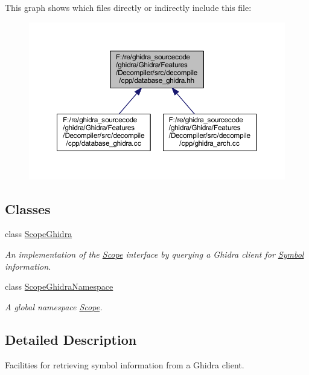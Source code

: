 This graph shows which files directly or indirectly include this file\+:
\nopagebreak
\begin{figure}[H]
\begin{center}
\leavevmode
\includegraphics[width=350pt]{database__ghidra_8hh__dep__incl}
\end{center}
\end{figure}
\subsection*{Classes}
\begin{DoxyCompactItemize}
\item 
class \mbox{\hyperlink{class_scope_ghidra}{Scope\+Ghidra}}
\begin{DoxyCompactList}\small\item\em An implementation of the \mbox{\hyperlink{class_scope}{Scope}} interface by querying a Ghidra client for \mbox{\hyperlink{class_symbol}{Symbol}} information. \end{DoxyCompactList}\item 
class \mbox{\hyperlink{class_scope_ghidra_namespace}{Scope\+Ghidra\+Namespace}}
\begin{DoxyCompactList}\small\item\em A global {\itshape namespace} \mbox{\hyperlink{class_scope}{Scope}}. \end{DoxyCompactList}\end{DoxyCompactItemize}


\subsection{Detailed Description}
Facilities for retrieving symbol information from a Ghidra client. 

